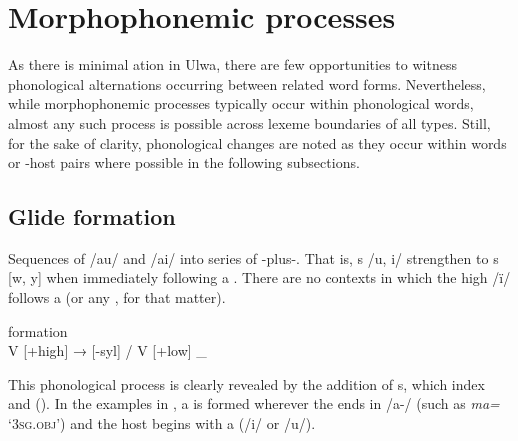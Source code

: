
\section{Morphophonemic processes}\label{sec:2.5}


As there is minimal ation in Ulwa, there are few opportunities to witness phonological alternations occurring between related word forms. Nevertheless, while morphophonemic processes typically occur within phonological words, almost any such process is possible across lexeme boundaries of all types. Still, for the sake of clarity, phonological changes are noted as they occur within words or -host pairs where possible in the following subsections.



\subsection{Glide formation}\label{sec:2.5.1}


Sequences of /au/ and /ai/  into series of -plus-. That is, s /u, i/ strengthen to s [w, y] when immediately following a  . There are no contexts in which the high  /ï/ follows a  (or any , for that matter).\largerpage

\ea%
    \label{ex:phon:61}
           formation\\
    V [+high] → [-syl] / V [+low] \_
\z

This phonological process is clearly revealed by the addition of  s, which index  and  (). In the examples in , a  is formed wherever the   ends in /a-/ (such as \textit{ma=} ‘3\textsc{sg.obj’}) and the  host begins with a  (/i/ or /u/).

